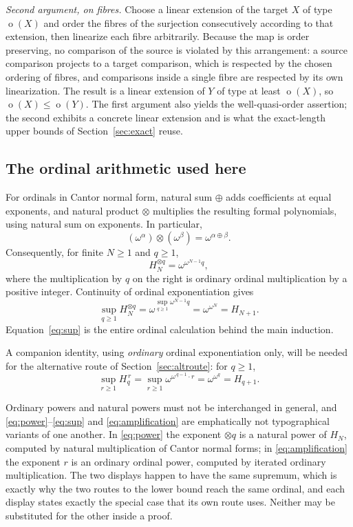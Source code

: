 \documentclass[11pt,a4paper]{article}
\numberwithin{equation}{section}
\theoremstyle{definition}
\theoremstyle{remark}
\newcommand{\mot}{\mathop{o}}
\newcommand{\Hn}[1]{H_{#1}}
\begin{document}
\emph{Second argument, on fibres.}
Choose a linear extension of the target $X$ of type $\mot(X)$ and order the
fibres of the surjection consecutively according to that extension, then
linearize each fibre arbitrarily. Because the map is order preserving, no
comparison of the source is violated by this arrangement: a source comparison
projects to a target comparison, which is respected by the chosen ordering of
fibres, and comparisons inside a single fibre are respected by its own
linearization. The result is a linear extension of $Y$ of type at least
$\mot(X)$, so $\mot(X)\le\mot(Y)$. The first argument also yields the
well-quasi-order assertion; the second exhibits a concrete linear extension
and is what the exact-length upper bounds of Section~\ref{sec:exact} reuse.

\subsection{The ordinal arithmetic used here}
For ordinals in Cantor normal form, natural sum $\oplus$ adds coefficients
at equal exponents, and natural product $\otimes$ multiplies the resulting
formal polynomials, using natural sum on exponents. In particular,
\[
 (\omega^\alpha)\otimes(\omega^\beta)=\omega^{\alpha\oplus\beta}.
\]
Consequently, for finite $N\ge1$ and $q\ge1$,
\begin{equation}\label{eq:power}
 H_N^{\otimes q}=\omega^{\omega^{N-1}q},
\end{equation}
where the multiplication by $q$ on the right is ordinary ordinal
multiplication by a positive integer. Continuity of ordinal exponentiation
gives
\begin{equation}\label{eq:sup}
 \sup_{q\ge1}H_N^{\otimes q}
 =\omega^{\sup_{q\ge1}\omega^{N-1}q}
 =\omega^{\omega^N}=H_{N+1}.
\end{equation}
Equation~\eqref{eq:sup} is the entire ordinal calculation behind the
main induction.

A companion identity, using \emph{ordinary} ordinal exponentiation only, will
be needed for the alternative route of Section~\ref{sec:altroute}: for
$q\ge1$,
\begin{equation}\label{eq:amplification}
 \sup_{r\ge1}\Hn q^{\,r}
  =\sup_{r\ge1}\omega^{\omega^{\,q-1}\cdot r}
  =\omega^{\omega^{q}}
  =\Hn{q+1}.
\end{equation}

Ordinary powers and natural powers must not be interchanged in general, and
\eqref{eq:power}--\eqref{eq:sup} and \eqref{eq:amplification} are emphatically
not typographical variants of one another. In \eqref{eq:power} the exponent
$\otimes q$ is a natural power of $\Hn N$, computed by natural multiplication
of Cantor normal forms; in \eqref{eq:amplification} the exponent $r$ is an
ordinary ordinal power, computed by iterated ordinary multiplication. The two
displays happen to have the same supremum, which is exactly why the two routes
to the lower bound reach the same ordinal, and each display states exactly the
special case that its own route uses. Neither may be substituted for the other
inside a proof.
\end{document}
